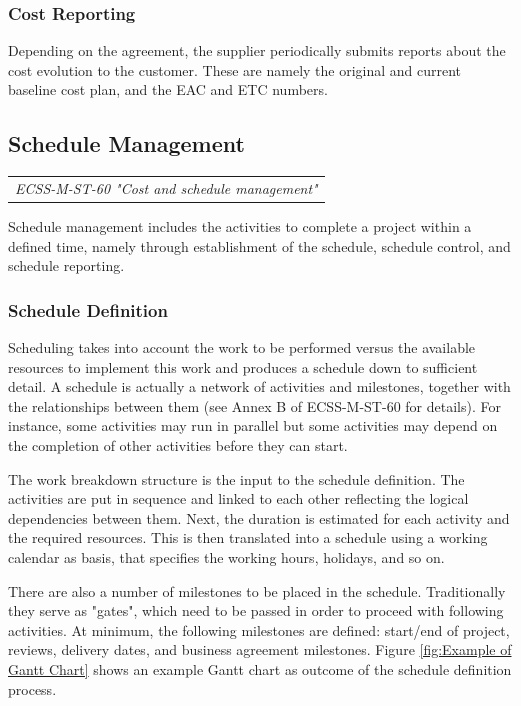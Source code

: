 \subsubsection{Cost Reporting}

Depending on the agreement, the supplier periodically submits reports about the cost evolution to the customer. These are namely the original and current baseline cost plan, and the EAC and ETC numbers.

\subsection{Schedule Management}

\begin{tabular}{l}
\textit{ECSS-M-ST-60 "Cost and schedule management" \cite{ECSS-M-ST-60}}
\end{tabular}

Schedule management includes the activities to complete a project within a defined time, namely through establishment of the schedule, schedule control, and schedule reporting. 

\subsubsection{Schedule Definition}

Scheduling takes into account the work to be performed versus the available resources to implement this work and produces a schedule down to sufficient detail. A schedule is actually a network of activities and milestones, together with the relationships between them (see Annex B of ECSS-M-ST-60 for details). For instance, some activities may run in parallel but some activities may depend on the completion of other activities before they can start. 

The work breakdown structure is the input to the schedule definition. The activities are put in sequence and linked to each other reflecting the logical dependencies between them. Next, the duration is estimated for each activity and the required resources. This is then translated into a schedule using a working calendar as basis, that specifies the working hours, holidays, and so on. 

There are also a number of milestones to be placed in the schedule. Traditionally they serve as "gates", which need to be passed in order to proceed with following activities. At minimum, the following milestones are defined: start/end of project, reviews, delivery dates, and business agreement milestones. Figure \ref{fig:Example of Gantt Chart} shows an example Gantt chart as outcome of the schedule definition process.

